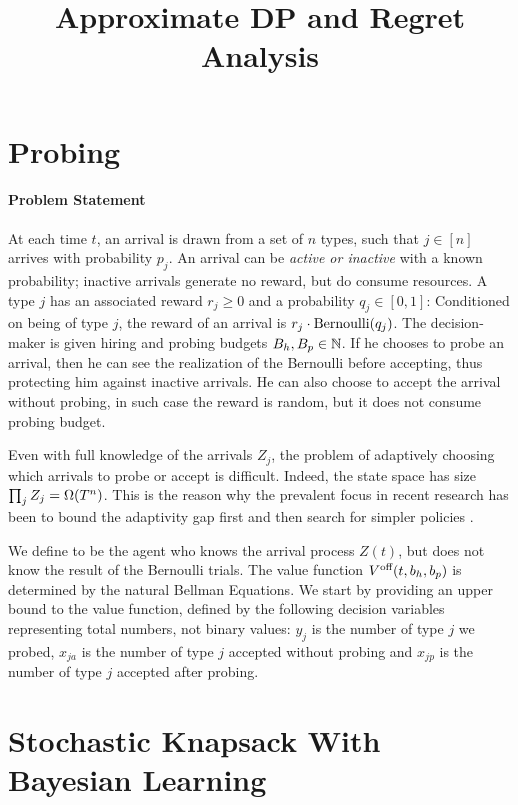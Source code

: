 \documentclass[letterpaper,11pt]{article}
\title{\vspace{-1cm} \bf Approximate DP and Regret Analysis   \vspace{-1.3cm}}
\author{}
\begin{document}
\maketitle

\section{Probing}

\paragraph{Problem Statement}
At each time $t$, an arrival is drawn from a set of $n$ types, such that $j\in[n]$ arrives with probability $p_j$.
An arrival can be \emph{active or inactive} with a known probability; inactive arrivals generate no reward, but do consume resources.
A type $j$ has an associated reward $r_j\geq 0$ and a probability $q_j\in [0,1]$: Conditioned on being of type $j$, the reward of an arrival is $r_j\cdot \operatorname{Bernoulli}(q_j)$.
The decision-maker is given hiring and probing budgets $B_h,B_p\in\mathbb{N}$.
If he chooses to probe an arrival, then he can see the realization of the Bernoulli before accepting, thus protecting him against inactive arrivals.
He can also choose to accept the arrival without probing, in such case the reward is random, but it does not consume probing budget.

Even with full knowledge of the arrivals $Z_j$, the problem of adaptively choosing which arrivals to probe or accept is difficult.
Indeed, the state space has size $\prod_jZ_j = \Omega(T^n)$.
This is the reason why the prevalent focus in recent research has been to bound the adaptivity gap first and then search for simpler policies \cite{adaptivity_gaps}.

We define \off to be the agent who knows the arrival process $Z(t)$, but does not know the result of the Bernoulli trials.
The value function $V^{\text{off}}(t,b_h,b_p)$ is determined by the natural Bellman Equations.
We start by providing an upper bound to the value function, defined by the following decision variables representing total numbers, not binary values: $y_j$ is the number of type $j$ we probed, $x_{ja}$ is the number of type $j$ accepted without probing and $x_{jp}$ is the number of type $j$ accepted after probing.









\section{Stochastic Knapsack With Bayesian Learning}
\end{document}
